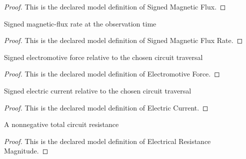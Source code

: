 \begin{proof}
  This is the declared model definition of Signed Magnetic Flux.
\end{proof}
\begin{definition}
  \label{def:physics:phyx-mini-0983:phyxminiproblems-problemphyxmini0983-signedmagneticfluxrate}
  Signed magnetic-flux rate at the observation time
\end{definition}
\begin{proof}
  This is the declared model definition of Signed Magnetic Flux Rate.
\end{proof}
\begin{definition}
  \label{def:physics:phyx-mini-0983:phyxminiproblems-problemphyxmini0983-electromotiveforce}
  Signed electromotive force relative to the chosen circuit traversal
\end{definition}
\begin{proof}
  This is the declared model definition of Electromotive Force.
\end{proof}
\begin{definition}
  \label{def:physics:phyx-mini-0983:phyxminiproblems-problemphyxmini0983-electriccurrent}
  Signed electric current relative to the chosen circuit traversal
\end{definition}
\begin{proof}
  This is the declared model definition of Electric Current.
\end{proof}
\begin{definition}
  \label{def:physics:phyx-mini-0983:phyxminiproblems-problemphyxmini0983-electricalresistancemagnitude}
  A nonnegative total circuit resistance
\end{definition}
\begin{proof}
  This is the declared model definition of Electrical Resistance Magnitude.
\end{proof}
